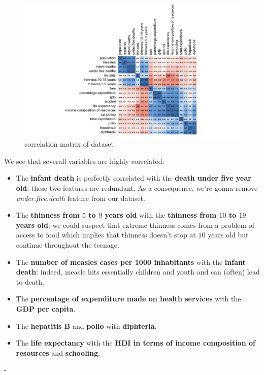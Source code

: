 \begin{figure}[H]
	\centering
	\includegraphics{figures/correlation_matrix.png}
	\caption{correlation matrix of dataset}
	\label{fig:correlation_matrix}
\end{figure}

We see that severall variables are highly correlated:
\begin{itemize}
	\item The \textbf{infant death} is perfectly correlated with the \textbf{death under five year old}: these two features are redundant. As a consequence, we're gonna remove \textit{under.five.death} feature from our dataset.
	\item The \textbf{thinness from $5$ to $9$ years old} with the \textbf{thinness from $10$ to $19$ years old}: we could suspect that extreme thinness comes from a problem of access to food which implies that thinness doesn't stop at $10$ years old but continue throughout the teenage.
	\item The \textbf{number of measles cases per 1000 inhabitants} with the \textbf{infant death}: indeed, measle hits essentially children and youth and can (often) lead to death.
	\item The \textbf{percentage of expenditure made on health services} with the \textbf{GDP per capita}.
	\item The \textbf{hepatitis B} and \textbf{polio} with \textbf{diphteria}.
	\item The \textbf{life expectancy} with the \textbf{HDI in terms of income composition of resources} and \textbf{schooling}.
\end{itemize}
- 